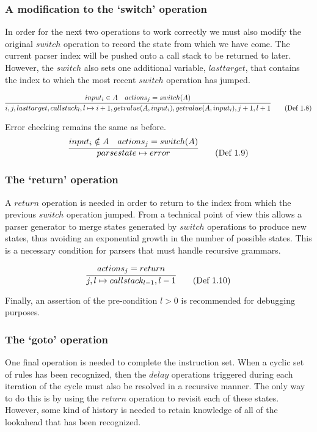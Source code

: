 \documentclass[a4paper,11pt]{article}
\begin{document}
\subsubsection{A modification to the `switch' operation}
In order for the next two operations to work correctly we must also modify the original $switch$ operation to record the state from which we have come.
The current parser index will be pushed onto a call stack to be returned to later. 
However, the $switch$ also sets one additional variable, $lasttarget$, that contains the index to which the most recent $switch$ operation has jumped.

\begin{equation}
\infer{i, j, lasttarget, callstack_l, l \mapsto i+1, getvalue(A, input_i), getvalue(A, input_i), j+1, l+1}{input_i \in A & actions_j = switch(A)} \tag{Def 1.8}
\end{equation}

Error checking remains the same as before.
\begin{equation}
\infer{parsestate \mapsto error}{input_i \notin A & actions_j = switch(A)} \tag{Def 1.9}
\end{equation}

\subsubsection{The `return' operation}
A $return$ operation is needed in order to return to the index from which the previous $switch$ operation jumped. 
From a technical point of view this allows a parser generator to merge states generated by $switch$ operations to produce new states, thus avoiding an exponential growth in the number of possible states.
This is a necessary condition for parsers that must handle recursive grammars.

\begin{equation}
\infer{j, l \mapsto callstack_{l-1}, l-1}{actions_j = return} \tag{Def 1.10}
\end{equation}

Finally, an assertion of the pre-condition $l > 0$ is recommended for debugging purposes.

\subsubsection{The `goto' operation}
One final operation is needed to complete the instruction set.
When a cyclic set of rules has been recognized, then the $delay$ operations triggered during each iteration of the cycle must also be resolved in a recursive manner.
The only way to do this is by using the $return$ operation to revisit each of these states.
However, some kind of history is needed to retain knowledge of all of the lookahead that has been recognized.
\end{document}
